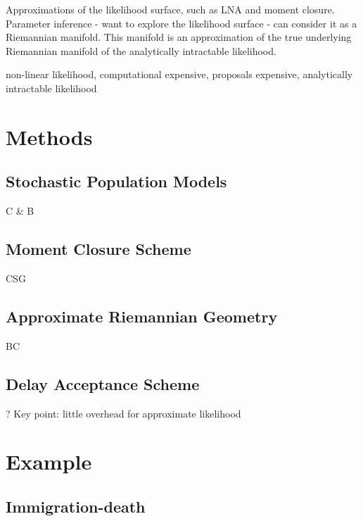 \documentclass{pnastwo}
\begin{document}
\begin{article}
Approximations of the likelihood surface, such as LNA and moment closure.  Parameter inference - want to explore the likelihood surface - can consider it as a Riemannian manifold.  This manifold is an approximation of the true underlying Riemannian manifold of the analytically intractable likelihood.

non-linear likelihood, computational expensive, proposals expensive, analytically intractable likelihood



\section{Methods}

\subsection{Stochastic Population Models}

C \& B

\subsection{Moment Closure Scheme}

CSG

\subsection{Approximate Riemannian Geometry}
BC

\subsection{Delay Acceptance Scheme}

?
Key point: little overhead for approximate likelihood


\section{Example}

\subsection{Immigration-death}


\end{article}
\end{document}
